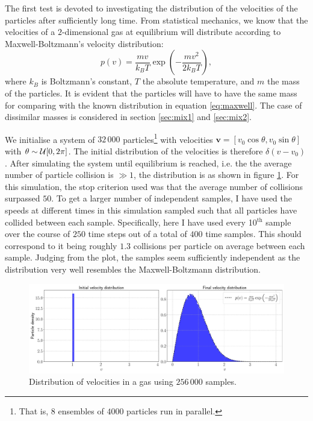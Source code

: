 The first test is devoted to investigating the distribution of the velocities of the particles after sufficiently long time. From statistical mechanics, we know that the velocities of a $2$-dimensional gas at equilibrium will distribute according to Maxwell-Boltzmann's velocity distribution: 
\begin{equation}\label{eq:maxwell}
	p(v) = \frac{mv}{k_B T} \exp{\left(- \frac{mv^2}{2 k_B T}\right)},
\end{equation}
where $k_B$ is Boltzmann's constant, $T$ the absolute temperature, and $m$ the mass of the particles. It is evident that the particles will have to have the same mass for comparing with the known distribution in equation \ref{eq:maxwell}. The case of dissimilar masses is considered in section \ref{sec:mix1} and \ref{sec:mix2}.

We initialise a system of $32\,000$ particles\footnote{That is, $8$ ensembles of $4000$ particles run in parallel.} with velocities $\mathbf{v} = [v_0 \cos{\theta} , v_0 \sin{\theta}]$ with $\theta \sim \mathcal{U}[0,2\pi]$. The initial distribution of the velocities is therefore $\delta (v - v_0)$. After simulating the system until equilibrium is reached, i.e. the the average number of particle collision is $\gg 1$, the distribution is as shown in figure \ref{fig:dist_1}. For this simulation, the stop criterion used was that the average number of collisions surpassed $50$. To get a larger number of independent samples, I have used the speeds at different times in this simulation sampled such that all particles have collided between each sample. Specifically, here I have used every 10$^\text{th}$ sample over the course of $250$ time steps out of a total of $400$ time samples. This should correspond to it being roughly $1.3$ collisions per particle on average between each sample. Judging from the plot, the samples seem sufficiently independent as the distribution very well resembles the Maxwell-Boltzmann distribution.

\begin{figure}[htb]
	\centering
	\includegraphics[width=\textwidth]{../fig/distribution}
	\caption{Distribution of velocities in a gas using $256\,000$ samples.}
	\label{fig:dist_1}
\end{figure}

